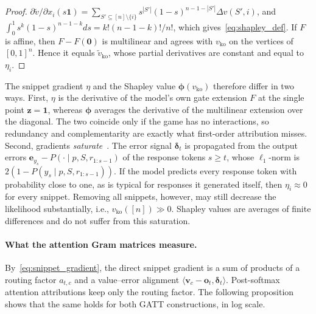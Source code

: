 \documentclass{article}
\begin{document}
\begin{proof}
$\partial \tilde{v} / \partial x_i (s\mathbf{1}) = \sum_{S' \subseteq [n] \setminus \{i\}} s^{|S'|} (1-s)^{n - 1 - |S'|} \Delta v(S', i)$, and $\int_0^1 s^k (1-s)^{n-1-k} ds = k!(n-1-k)!/n!$, which gives~\eqref{eq:shapley_def}. If $F$ is affine, then $F - F(\mathbf{0})$ is multilinear and agrees with $v_{\text{ko}}$ on the vertices of $[0,1]^n$. Hence it equals $\tilde{v}_{\text{ko}}$, whose partial derivatives are constant and equal to $\eta_i$.
\end{proof}

The snippet gradient $\eta$ and the Shapley value $\boldsymbol{\phi}(v_{\text{ko}})$ therefore differ in two ways. First, $\eta$ is the derivative of the model's own gate extension $F$ at the single point $\mathbf{z} = \mathbf{1}$, whereas $\boldsymbol{\phi}$ averages the derivative of the multilinear extension over the diagonal. The two coincide only if the game has no interactions, so redundancy and complementarity are exactly what first-order attribution misses. Second, gradients \emph{saturate}~\cite{sundararajan2017axiomatic}. The error signal $\boldsymbol{\delta}_t$ is propagated from the output errors $\mathbf{e}_{y_s} - P(\cdot \mid p, S, r_{1:s-1})$ of the response tokens $s \ge t$, whose $\ell_1$-norm is $2(1 - P(y_s \mid p, S, r_{1:s-1}))$. If the model predicts every response token with probability close to one, as is typical for responses it generated itself, then $\eta_i \approx 0$ for every snippet. Removing all snippets, however, may still decrease the likelihood substantially, i.e., $v_{\text{ko}}([n]) \gg 0$. Shapley values are averages of finite differences and do not suffer from this saturation.

\paragraph{What the attention Gram matrices measure.}
By~\eqref{eq:snippet_gradient}, the direct snippet gradient is a sum of products of a routing factor $a_{t,c}$ and a value--error alignment $\langle \mathbf{v}_c - \mathbf{o}_t, \boldsymbol{\delta}_t \rangle$. Post-softmax attention attributions keep only the routing factor. The following proposition shows that the same holds for both GATT constructions, in log scale.
\end{document}
